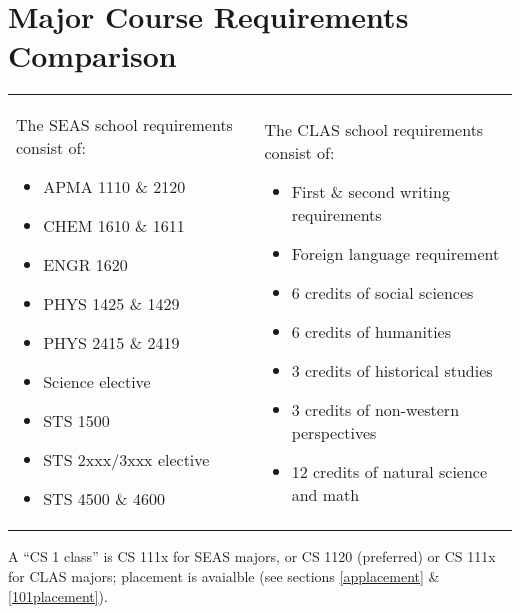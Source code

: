 \documentclass[10pt,letter]{book}
\newenvironment{itemlist}{
\begin{itemize}
\setlength{\itemsep}{0pt}
\setlength{\parskip}{0pt}}
{\end{itemize}}
\newcommand{\mysection}[1]{\section{#1}\renewcommand{\rightmark}{#1}}
\begin{document}

\clearpage

\mysection{Major Course Requirements Comparison}

\begin{figure}[h!]
\begin{center}
\end{center}
\end{figure}

\noindent
\begin{tabular}{p{2in}p{2.25in}}

The SEAS school requirements consist of:
\begin{itemlist}
\item APMA 1110 \& 2120
\item CHEM 1610 \& 1611
\item ENGR 1620
\item PHYS 1425 \& 1429
\item PHYS 2415 \& 2419
\item Science elective
\item STS 1500
\item STS 2xxx/3xxx elective
\item STS 4500 \& 4600
\end{itemlist}

&

The CLAS school requirements consist of:
\begin{itemlist}
\item First \& second writing requirements
\item Foreign language requirement
\item 6 credits of social sciences
\item 6 credits of humanities
\item 3 credits of historical studies
\item 3 credits of non-western perspectives
\item 12 credits of natural science and math
\end{itemlist}

\end{tabular}

\noindent A ``CS 1 class'' is CS 111x for SEAS majors, or CS 1120
(preferred) or CS 111x for CLAS majors; placement is avaialble (see
sections \ref{applacement} \& \ref{101placement}).
\end{document}
